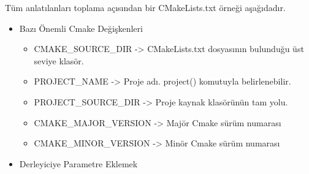 \documentclass[
]{book}
\newenvironment{Shaded}{\begin{snugshade}}{\end{snugshade}}
\newcommand{\ExtensionTok}[1]{#1}
\newcommand{\KeywordTok}[1]{\textcolor[rgb]{0.13,0.29,0.53}{\textbf{#1}}}
\newcommand{\NormalTok}[1]{#1}
\newcommand{\StringTok}[1]{\textcolor[rgb]{0.31,0.60,0.02}{#1}}
\newcommand{\VariableTok}[1]{\textcolor[rgb]{0.00,0.00,0.00}{#1}}
\providecommand{\tightlist}{%
  \setlength{\itemsep}{0pt}\setlength{\parskip}{0pt}}
\begin{document}
Tüm anlatılanları toplama açısından bir CMakeLists.txt örneği aşağıdadır.

\begin{Shaded}
\end{Shaded}

\begin{itemize}
\item
  Bazı Önemli Cmake Değişkenleri

  \begin{itemize}
  \tightlist
  \item
    CMAKE\_SOURCE\_DIR -\textgreater{} CMakeLists.txt dosyasının bulunduğu üst seviye klasör.
  \item
    PROJECT\_NAME -\textgreater{} Proje adı. project() komutuyla belirlenebilir.
  \item
    PROJECT\_SOURCE\_DIR -\textgreater{} Proje kaynak klasörünün tam yolu.
  \item
    CMAKE\_MAJOR\_VERSION -\textgreater{} Majör Cmake sürüm numarası
  \item
    CMAKE\_MINOR\_VERSION -\textgreater{} Minör Cmake sürüm numarası
  \end{itemize}
\item
  Derleyiciye Parametre Eklemek
\end{itemize}
\end{document}
